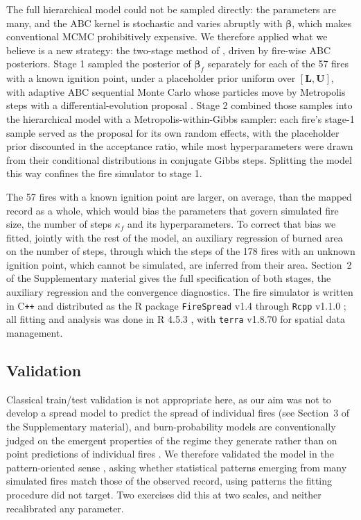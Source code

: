 \documentclass[ResearchPaper,linenum]{CSIRO_LaTeX_Template}
\begin{document}
The full hierarchical model could not be sampled directly: the parameters are many,
and the ABC kernel is stochastic and varies abruptly with $\boldsymbol{\beta}$, which
makes conventional MCMC prohibitively expensive. We therefore applied what we believe is a new
strategy: the two-stage method of \citet{lunn2013fully}, driven by fire-wise ABC
posteriors. Stage 1 sampled the posterior of $\boldsymbol{\beta}_f$
separately for each of the 57 fires with a known ignition point, under a placeholder
prior uniform over $[\mathbf{L}, \mathbf{U}]$, with adaptive ABC sequential Monte Carlo
\citep{delmoral2012adaptive} whose particles move by Metropolis steps with a
differential-evolution proposal \citep{terbraak2006markov}. Stage 2 combined those
samples into the hierarchical model with a Metropolis-within-Gibbs sampler: each fire's
stage-1 sample served as the proposal for its own random effects, with the placeholder
prior discounted in the acceptance ratio, while most hyperparameters were drawn from
their conditional distributions in conjugate Gibbs steps. Splitting the model this way
confines the fire simulator to stage 1.

The 57 fires with a known ignition point are larger, on average, than the mapped
record as a whole, which would bias the parameters that govern simulated fire size,
the number of steps $\kappa_f$ and its hyperparameters. To correct that bias we fitted,
jointly with the rest of the model, an auxiliary regression of burned area on the
number of steps, through which the steps of the 178 fires with an unknown ignition point,
which cannot be simulated, are inferred from their area. Section~2 of the Supplementary
material gives the full specification of both stages, the auxiliary regression and the
convergence diagnostics. The fire simulator is written in C\texttt{++} and distributed
as the R package \texttt{FireSpread} v1.4 \citep{firespread} through \texttt{Rcpp}
v1.1.0 \citep{Rcpp}; all fitting and analysis was done in R 4.5.3 \citep{R}, with
\texttt{terra} v1.8.70 \citep{terra} for spatial data management.

\subsection{Validation}

Classical train/test validation is not appropriate here, as our aim was not
to develop a spread model to predict the spread of individual fires
(see Section~3 of the Supplementary material), and burn-probability models are
conventionally judged on the emergent properties of the regime they generate rather
than on point predictions of individual fires \citep{parisien2020commentary}. We
therefore validated the model in the pattern-oriented sense \citep{grimm2005pattern,
hartig2011statistical}, asking whether statistical patterns emerging from many
simulated fires match those of the observed record, using patterns the fitting
procedure did not target. Two exercises did this at two scales, and neither
recalibrated any parameter.
\end{document}
